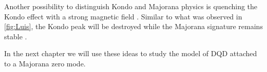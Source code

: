  


Another possibility to distinguish Kondo and Majorana physics is quenching the Kondo effect with a strong magnetic field . Similar to what was observed in \ref{fig:Luis}, the Kondo peak will be destroyed while the Majorana signature remains stable \cite{ruiz-tijerina_interaction_2015}. 

In the next chapter we will use these ideas to study the model of DQD attached to a Majorana zero mode.








